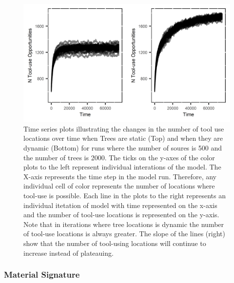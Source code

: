 \documentclass[9pt,twocolumn,twoside,]{pnas-new}
\begin{document}
\begin{figure}

\includegraphics[width=6.5in]{Reeves_et_al_2021_Panda_ABM_files/figure-latex/figure 2-1.png}

\caption{Time series plots illustrating the changes in the number of tool use locations over time when Trees are static (Top) and when they are dynamic (Bottom) for runs where the number of soures is 500 and the number of trees is 2000. The ticks on the y-axes of the color plots to the left represent individual interations of the model. The X-axis represents the time step in the model run. Therefore, any individual cell of color represents the number of locations where tool-use is possible. Each line in the plots to the right represents an individual itetation of model with time represented on the x-axis and the number of tool-use locations is represented on the y-axis. Note that in iterations where tree locations is dynamic the number of tool-use locations is always greater. The slope of the lines (right) show that the number of tool-using locations will continue to increase instead of plateauing.}

\label{tree_death}

\end{figure}

\hypertarget{material-signature}{%
\subsubsection{Material Signature}\label{material-signature}}
\end{document}

